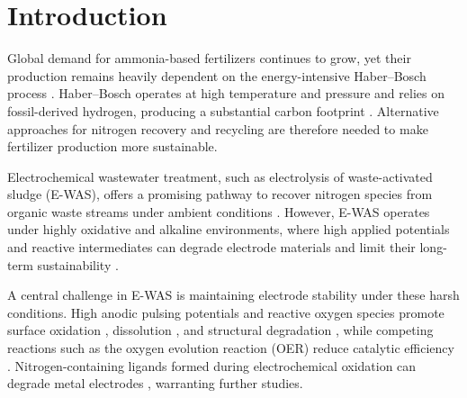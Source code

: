 \documentclass[twoside,twocolumn,9pt]{article}
\begin{document}



\section{Introduction}
Global demand for ammonia-based fertilizers continues to grow, yet their production remains heavily dependent on the energy-intensive Haber–Bosch process \cite{Schloegl2003CatalyticStory,Smil1999DetonatorExplosion,Erisman2008HowWorld}. Haber–Bosch operates at high temperature and pressure and relies on fossil-derived hydrogen, producing a substantial carbon footprint \cite{Liu2022ProspectsFixation,Suryanto2021NitrogenShuttle}. Alternative approaches for nitrogen recovery and recycling are therefore needed to make fertilizer production more sustainable.

Electrochemical wastewater treatment, such as electrolysis of waste-activated sludge (E-WAS), offers a promising pathway to recover nitrogen species from organic waste streams under ambient conditions \cite{Botte2024InnovativeRecovery,Alvarez-Pugliese2024PerspectivesWaste,Zeng2019ElectrochemicalSulfide,Mulchandani2016RecoverySludges}. However, E-WAS operates under highly oxidative and alkaline environments, where high applied potentials and reactive intermediates can degrade electrode materials and limit their long-term sustainability \cite{Popov2015ThermodynamicsCorrosion,Sanchis2022NitrateOverview}.

A central challenge in E-WAS is maintaining electrode stability under these harsh conditions. High anodic pulsing potentials and reactive oxygen species promote surface oxidation \cite{Mom-jacs.8b12284}, dissolution \cite{Kok-jacs.4c06284}, and structural degradation \cite{Schweinar-jpclett.0c01258}, while competing reactions such as the oxygen evolution reaction (OER) reduce catalytic efficiency \cite{Li2021Ru-DopedNitrate,Wang2022ElectrochemicalOxidation,Dai2020ElectrochemicalOxides}. Nitrogen-containing ligands formed during electrochemical oxidation can degrade metal electrodes \cite{Han2000FactorsSolutions,Young2022MetalAmmonia}, warranting further studies.
\end{document}
